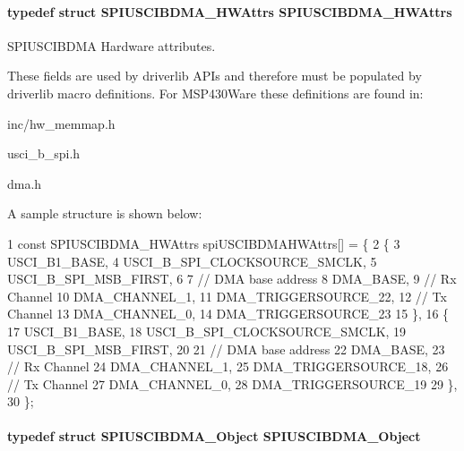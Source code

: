 \paragraph[{S\+P\+I\+U\+S\+C\+I\+B\+D\+M\+A\+\_\+\+H\+W\+Attrs}]{\setlength{\rightskip}{0pt plus 5cm}typedef struct {\bf S\+P\+I\+U\+S\+C\+I\+B\+D\+M\+A\+\_\+\+H\+W\+Attrs}  {\bf S\+P\+I\+U\+S\+C\+I\+B\+D\+M\+A\+\_\+\+H\+W\+Attrs}}\label{_s_p_i_u_s_c_i_b_d_m_a_8h_aead599faafac7ef553d430f31c144057}


S\+P\+I\+U\+S\+C\+I\+B\+D\+M\+A Hardware attributes. 

These fields are used by driverlib A\+P\+Is and therefore must be populated by driverlib macro definitions. For M\+S\+P430\+Ware these definitions are found in\+:
\begin{DoxyItemize}
\item inc/hw\+\_\+memmap.\+h
\item usci\+\_\+b\+\_\+spi.\+h
\item dma.\+h
\end{DoxyItemize}

A sample structure is shown below\+: 
\begin{DoxyCode}
1 const SPIUSCIBDMA\_HWAttrs spiUSCIBDMAHWAttrs[] = \{
2     \{
3         USCI\_B1\_BASE,
4         USCI\_B\_SPI\_CLOCKSOURCE\_SMCLK,
5         USCI\_B\_SPI\_MSB\_FIRST,
6 
7         // DMA base address
8         DMA\_BASE,
9         // Rx Channel
10         DMA\_CHANNEL\_1,
11         DMA\_TRIGGERSOURCE\_22,
12         // Tx Channel
13         DMA\_CHANNEL\_0,
14         DMA\_TRIGGERSOURCE\_23
15     \},
16     \{
17         USCI\_B1\_BASE,
18         USCI\_B\_SPI\_CLOCKSOURCE\_SMCLK,
19         USCI\_B\_SPI\_MSB\_FIRST,
20 
21         // DMA base address
22         DMA\_BASE,
23         // Rx Channel
24         DMA\_CHANNEL\_1,
25         DMA\_TRIGGERSOURCE\_18,
26         // Tx Channel
27         DMA\_CHANNEL\_0,
28         DMA\_TRIGGERSOURCE\_19
29     \},
30 \};
\end{DoxyCode}
\paragraph[{S\+P\+I\+U\+S\+C\+I\+B\+D\+M\+A\+\_\+\+Object}]{\setlength{\rightskip}{0pt plus 5cm}typedef struct {\bf S\+P\+I\+U\+S\+C\+I\+B\+D\+M\+A\+\_\+\+Object}  {\bf S\+P\+I\+U\+S\+C\+I\+B\+D\+M\+A\+\_\+\+Object}}\label{_s_p_i_u_s_c_i_b_d_m_a_8h_a0698c405d1ebd4309591999417fce4de}


